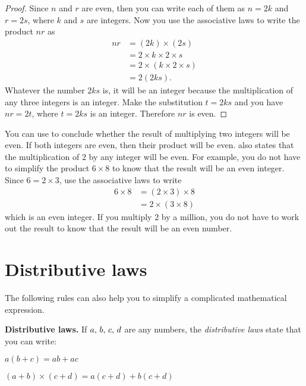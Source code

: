 \documentclass[a4paper,oneside,12pt]{article}
\begin{document}
\begin{proof}
Since $n$ and $r$ are even, then you can write each of them as
$n = 2k$ and $r = 2s$, where $k$ and $s$ are integers.  Now you use
the associative laws to write the product $nr$ as
\begin{align*}
nr
&=
(2k) \times (2s) \\[4pt]
&=
2 \times k \times 2 \times s \\[4pt]
&=
2 \times (k \times 2 \times s) \\[4pt]
&=
2 (2ks).
\end{align*}
Whatever the number $2ks$ is, it will be an integer because the
multiplication of any three integers is an integer.  Make the
substitution $t = 2ks$ and you have $nr = 2t$, where $t = 2ks$ is an
integer.  Therefore $nr$ is even.
\end{proof}

You can use  to conclude
whether the result of multiplying two integers will be even.  If both
integers are even, then their product will be even.
 also states that the
multiplication of $2$ by any integer will be even. For example, you
do not have to simplify the product $6 \times 8$ to know that the
result will be an even integer.  Since $6 = 2 \times 3$, use the
associative laws to write
\begin{align*}
6 \times 8
&= (2 \times 3) \times 8 \\[4pt]
&=
2 \times (3 \times 8)
\end{align*}
which is an even integer.  If you multiply $2$ by a million, you do
not have to work out the result to know that the result will be an
even number.



\section{Distributive laws}

The following rules can also help you to simplify a complicated
mathematical expression.

\begin{definition}
\textbf{Distributive laws.}
If ${a},\, {b},\, {c},\, {d}$ are any numbers, the
\emph{distributive laws} state that you can write:
\begin{packedenumeral}
\item $a (b + c) = ab + ac$

\item $(a + b) \times (c + d) = a(c + d) + b(c + d)$
\end{packedenumeral}
\end{definition}
\end{document}

